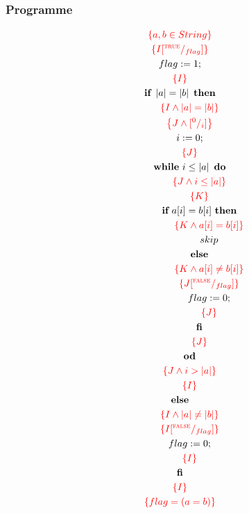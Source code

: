 \documentclass[a4paper,12pt,fleqn]{scrartcl}
\newcommand{\assn}[1]{{\color{red}\left\{#1\right\}}}
\newcommand{\length}[1]{\left|#1\right|}
\begin{document}
\subsubsection*{Programme}
\begin{gather*}
    \assn{a,b \in String}\\
    \assn{I\subst{\True}{flag}}\\
    flag \Ass 1;\\
    \assn{I}\\
    \IF ~\length{a} = \length{b}~\THEN\\
    \qquad \assn{I \And \length{a}= \length{b}}\\
    \qquad \assn{J \And \subst{0}{i}}\\
    \qquad i\Ass 0;\\
    \qquad \assn{J}\\
    \qquad \WHILE~i \leq \length{a} ~ \DO\\
    \qquad \qquad \assn{J \And i \leq \length{a}}\\
    \qquad \qquad \assn{K }\\
    \qquad \qquad \IF ~a[i] = b[i]~ \THEN \\
    \qquad \qquad \qquad \assn{K \And a[i]=  b[i]}\\
    \qquad \qquad \qquad skip \\
    \qquad \qquad \ELSE \\
    \qquad \qquad \qquad \assn{K \And a[i]\neq b[i]}\\
    \qquad \qquad \qquad \assn{J \subst{\False}{flag}}\\
    \qquad \qquad \qquad flag \Ass 0;\\
    \qquad \qquad \qquad \assn{J}\\
    \qquad \qquad \FI \\
    \qquad \qquad \assn{J}\\
    \qquad \OD\\
    \qquad \assn{J \And i > \length{a}}\\
    \qquad \assn{I}\\
    \ELSE\\
    \qquad \assn{I \And \length{a} \neq \length{b}}\\
    \qquad \assn{I \subst{\False}{flag}}\\
    \qquad flag \Ass 0;\\
    \qquad \assn{I}\\
    \FI\\
    \assn{I}\\
    \assn{flag = (a=b)}\\
\end{gather*}
\end{document}

